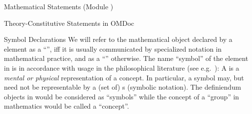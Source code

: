 \begin{tchapter}[id=statements,short=Mathematical Statements]{Mathematical Statements (Module {})}
\begin{tsection}[id=definitions]{Theory-Constitutive Statements in OMDoc}
\begin{tsubsection}[id=symbol-dec]{Symbol Declarations}
  We will refer to the mathematical object declared by a {} element as a
  ``{}'', iff it is usually communicated by specialized notation in
  mathematical practice, and as a ``{}'' otherwise.  The name ``symbol''
  of the {} element in {\omdoc} is in accordance with usage in the
  philosophical literature (see e.g.~\cite{NewSim:cseisas81}): A {} is a
  {\emph{mental or physical}} representation
  {} of a concept.  In
  particular, a symbol may, but need not be representable by a (set of)
  {s} (symbolic notation).  The definiendum objects in
  {} would be considered as ``symbols'' while the concept of a
  ``group'' in mathematics would be called a ``concept''.
  

\end{tsubsection}
\end{tsection}
\end{tchapter}
